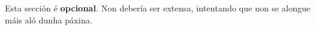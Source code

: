 \label{sec:agradecementos}

Esta sección é \textbf{opcional}. Non debería ser extensa, intentando que non se alongue máis aló dunha páxina. 

{
\color{gray}
\Blindtext[2][1]
}